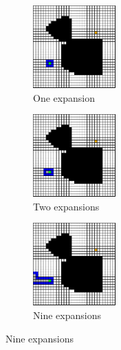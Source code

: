 \begin{figure}
  \begin{center}
    \begin{subfigure}[t]{0.3\textwidth}
      \includegraphics[width=1.25in]{planning/figs/dfs_0001.pdf}
       \caption{One expansion}
    \end{subfigure}
    \begin{subfigure}[t]{0.3\textwidth}
      \includegraphics[width=1.25in]{planning/figs/dfs_0002.pdf}
       \caption{Two expansions}
    \end{subfigure}
    \begin{subfigure}[t]{0.3\textwidth}
      \includegraphics[width=1.25in]{planning/figs/dfs_0009.pdf}
       \caption{Nine expansions}
    \end{subfigure}

    \vspace{.2in}


\end{center}
\end{figure}

